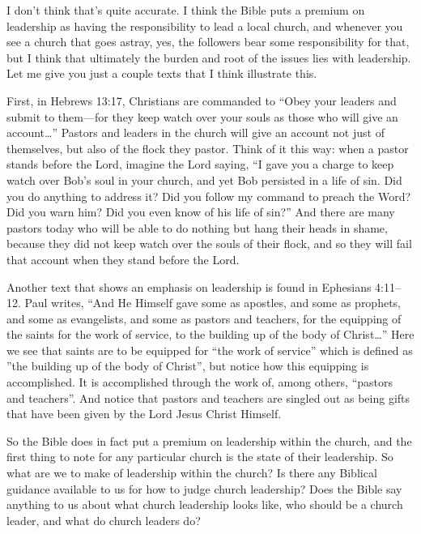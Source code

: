 \documentclass[letterpaper, 12pt]{article}
\begin{document}
    I don't think that's quite accurate. I think the Bible puts a
    premium on leadership as having the responsibility to lead a local
    church, and whenever you see a church that goes astray, yes, the
    followers bear some responsibility for that, but I think that
    ultimately the burden and root of the issues lies with leadership.
    Let me give you just a couple texts that I think illustrate this.
    
    First, in Hebrews 13:17, Christians are commanded to ``Obey your
    leaders and submit to them---for they keep watch over your souls as
    those who will give an account\ldots'' Pastors and leaders in the
    church will give an account not just of themselves, but also of the
    flock they pastor. Think of it this way: when a pastor stands before
    the Lord, imagine the Lord saying, ``I gave you a charge to keep
    watch over Bob's soul in your church, and yet Bob persisted in a
    life of sin. Did you do anything to address it? Did you follow my
    command to preach the Word? Did you warn him? Did you even know of
    his life of sin?'' And there are many pastors today who will be able
    to do nothing but hang their heads in shame, because they did not
    keep watch over the souls of their flock, and so they will fail that
    account when they stand before the Lord.

    Another text that shows an emphasis on leadership is found in
    Ephesians 4:11--12. Paul writes, ``And He Himself gave some as
    apostles, and some as prophets, and some as evangelists, and some as
    pastors and teachers, for the equipping of the saints for the work
    of service, to the building up of the body of Christ\ldots'' Here we
    see that saints are to be equipped for ``the work of service'' which
    is defined as ''the building up of the body of Christ'', but notice
    how this equipping is accomplished. It is accomplished through the
    work of, among others, ``pastors and teachers''. And notice that
    pastors and teachers are singled out as being gifts that have been
    given by the Lord Jesus Christ Himself.

    So the Bible does in fact put a premium on leadership within the
    church, and the first thing to note for any particular church is the
    state of their leadership. So what are we to make of leadership
    within the church? Is there any Biblical guidance available to us
    for how to judge church leadership? Does the Bible say anything to
    us about what church leadership looks like, who should be a church
    leader, and what do church leaders do? 
\end{document}
